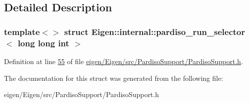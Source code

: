 \subsection{Detailed Description}
\subsubsection*{template$<$$>$\newline
struct Eigen\+::internal\+::pardiso\+\_\+run\+\_\+selector$<$ long long int $>$}



Definition at line \hyperlink{eigen_2_eigen_2src_2_pardiso_support_2_pardiso_support_8h_source_l00055}{55} of file \hyperlink{eigen_2_eigen_2src_2_pardiso_support_2_pardiso_support_8h_source}{eigen/\+Eigen/src/\+Pardiso\+Support/\+Pardiso\+Support.\+h}.



The documentation for this struct was generated from the following file\+:\begin{DoxyCompactItemize}
\item 
eigen/\+Eigen/src/\+Pardiso\+Support/\+Pardiso\+Support.\+h\end{DoxyCompactItemize}
